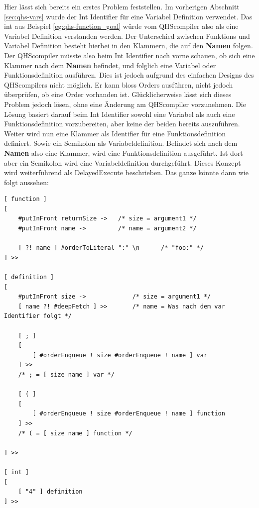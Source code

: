 Hier lässt sich bereits ein erstes Problem feststellen. Im vorherigen Abschnitt \ref{sec:qhs-vars} wurde der Int Identifier für eine Variabel Definition verwendet. 
Das int aus Beispiel \ref{eg:qhs-function_goal} würde vom QHScompiler also als eine Variabel Definition verstanden werden. Der Unterschied zwischen Funktions und Variabel Definition besteht hierbei in den Klammern,
die auf den \textbf{Namen} folgen. Der QHScompiler müsste also beim Int Identifier nach vorne schauen, ob sich eine Klammer nach dem \textbf{Namen} befindet, und folglich eine Variabel oder Funktionsdefinition ausführen.
Dies ist jedoch aufgrund des einfachen Designs des QHScompilers nicht möglich. Er kann bloss Orders ausführen, nicht jedoch überprüfen, ob eine Order vorhanden ist. Glücklicherweise lässt sich dieses Problem jedoch lösen,
ohne eine Änderung am QHScompiler vorzunehmen. Die Lösung basiert darauf beim Int Identifier sowohl eine Variabel als auch eine Funktionsdefinition vorzubereiten, aber keine der beiden bereits auszuführen.
Weiter wird nun eine Klammer als Identifier für eine Funktionsdefinition definiert. Sowie ein Semikolon als Variabeldefinition. Befindet sich nach dem \textbf{Namen} also eine Klammer, wird eine Funktionsdefinition ausgeführt.
Ist dort aber ein Semikolon wird eine Variabeldefinition durchgeführt. Dieses Konzept wird weiterführend als DelayedExecute beschrieben. Das ganze könnte dann wie folgt aussehen:

\begin{lstlisting}[language=QHS, caption=Implementation eines DelayedExecute für Definitionen]
[ function ]
[
    #putInFront returnSize ->   /* size = argument1 */
    #putInFront name ->         /* name = argument2 */

    [ ?! name ] #orderToLiteral ":" \n      /* "foo:" */
] >>

[ definition ]
[
    #putInFront size ->             /* size = argument1 */
    [ name ?! #deepFetch ] >>       /* name = Was nach dem var Identifier folgt */

    [ ; ]
    [
        [ #orderEnqueue ! size #orderEnqueue ! name ] var 
    ] >>
    /* ; = [ size name ] var */

    [ ( ]
    [
        [ #orderEnqueue ! size #orderEnqueue ! name ] function 
    ] >>
    /* ( = [ size name ] function */

] >>

[ int ]
[
    [ "4" ] definition
] >>
\end{lstlisting}


